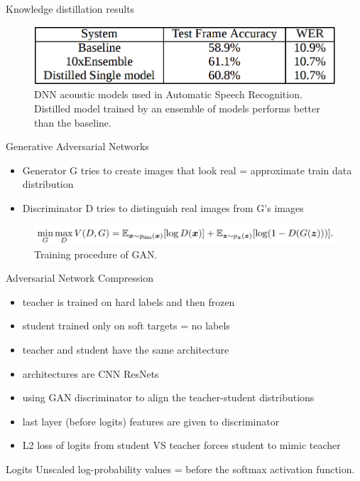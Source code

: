 \documentclass{beamer}
\begin{document}
\begin{frame}{Knowledge distillation results}

\begin{figure}[h]
\includegraphics[width=\textwidth]{img/distilled_result}
\caption{DNN acoustic models used in Automatic Speech Recognition. Distilled model trained by an ensemble of models performs better than the baseline. \cite{cit:distill}}
\end{figure}

\end{frame}
\begin{frame}{Generative Adversarial Networks}

\begin{itemize}
\item Generator G tries to create images that look real = approximate train data distribution
\item Discriminator D tries to distinguish real images from G's images
\end{itemize}


\begin{figure}[h]
\includegraphics[width=\textwidth]{img/GAN}
\caption{Training procedure of GAN. \cite{cit:gan}}
\end{figure}

\end{frame}
\begin{frame}{Adversarial Network Compression}

\begin{itemize}
\item teacher is trained on hard labels and then frozen
\item student trained only on soft targets = no labels
\item teacher and student have the same architecture
\item architectures are CNN ResNets
\item using GAN discriminator to align the teacher-student distributions
\item last layer (before logits) features are given to discriminator
\item L2 loss of logits from student VS teacher forces student to mimic teacher 
\end{itemize}

\begin{block}{Logits}
Unscaled log-probability values = before the softmax
activation function.
\end{block}


\end{frame}
\end{document}
